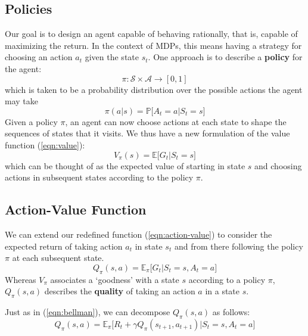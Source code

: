 \documentclass[journal, onecolumn, 12pt, draftclsnofoot]{IEEEtran}
\numberwithin{equation}{section}
\newcommand{\kword}[1]{\textbf{#1}}
\newcommand{\mc}[1]{\mathcal{#1}}
\begin{document}
		\subsection{Policies}
		\par Our goal is to design an agent capable of behaving rationally, that is, capable of maximizing the return. In the context of MDPs, this means having a strategy for choosing an action $a_t$ given the state $s_t$. One approach is to describe a \kword{policy} for the agent:
		$$ \pi: \mc{S} \times \mc{A} \to [0, 1]$$
		which is taken to be a probability distribution over the possible actions the agent may take
		\begin{equation}
			\label{eqn:policy_as_prob_dist}
			\pi(a \vert s) = \mathbb{P}\big[ A_t = a \vert S_t = s \big]
		\end{equation}
		Given a policy $\pi$, an agent can now choose actions at each state to shape the sequences of states that it visits. We thus have a new formulation of the value function (\ref{eqn:value}):
		\begin{equation}
			\label{eqn:action-value}
			V_\pi(s) = \mathbb{E}\big[ G_t \vert S_t = s \big]
		\end{equation}
		which can be thought of as the expected value of starting in state $s$ and choosing actions in subsequent states according to the policy $\pi$.
		\subsection{Action-Value Function}
		\par We can extend our redefined function (\ref{eqn:action-value}) to consider the expected return of taking action $a_t$ in state $s_t$ and from there following the policy $\pi$ at each subsequent state.
		\begin{equation}
			\label{eqn:q_non_bellman}
			Q_\pi(s,a) = \mathbb{E}_\pi \big[ G_t \vert S_t = s, A_t = a \big]
		\end{equation}
		Whereas $V_\pi$ associates a `goodness' with a state $s$ according to a policy $\pi$, $Q_\pi(s,a)$ describes the \kword{quality} of taking an action $a$ in a state $s$.
		\par Just as in (\ref{eqn:bellman}), we can decompose $Q_\pi(s,a)$ as follows:
		\begin{equation}
			\label{eqn:q_bellman}
			Q_\pi(s,a) = \mathbb{E}_\pi \big[ R_t + \gamma Q_\pi(s_{t+1}, a_{t+1}) \vert S_t = s, A_t = a \big]
		\end{equation}
\end{document}
